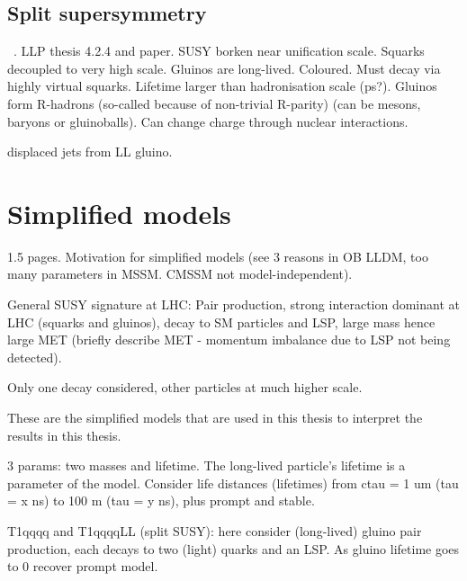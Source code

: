 \subsection{Split supersymmetry}
\label{sec:theory-splitsusy}
~\cite{splitsusy1,splitsusy2}.
LLP thesis 4.2.4 and paper.
SUSY borken near unification scale. Squarks decoupled to very 
high scale. Gluinos are long-lived. Coloured. Must 
decay via highly virtual squarks. Lifetime larger than hadronisation scale 
(ps?). Gluinos form R-hadrons (so-called because of non-trivial R-parity) (can 
be mesons, baryons or gluinoballs). Can change charge through nuclear 
interactions.

displaced jets from LL gluino.

\section{Simplified models}
\label{sec:theory-simplifiedmodels}
1.5 pages. Motivation for simplified models (see 3 reasons in OB LLDM, too many 
parameters in MSSM. CMSSM not model-independent).

General SUSY signature at LHC: Pair production, strong interaction dominant at 
LHC (squarks and gluinos), decay to SM particles and LSP, large mass hence 
large MET (briefly describe MET - momentum imbalance due to LSP not being 
detected).

Only one decay considered, other particles at much higher scale.

These are the simplified models that are used in this thesis to interpret the 
results in this thesis.

3 params: two masses and lifetime.
The long-lived particle's lifetime is a parameter of the model. Consider life 
distances (lifetimes) from ctau = 1 um (tau = x ns) to 100 m (tau = y ns), plus 
prompt and stable.



T1qqqq and T1qqqqLL (split SUSY): here consider (long-lived) gluino pair 
production, each decays to two (light) quarks and an LSP. As gluino lifetime 
goes to 0 recover prompt model.

